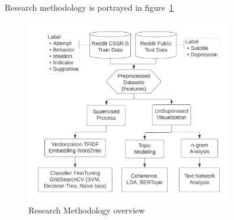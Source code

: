 \documentclass[sn-mathphys,Numbered]{sn-jnl}%
\theoremstyle{thmstyleone}%
\theoremstyle{thmstyletwo}%
\theoremstyle{thmstylethree}%
\begin{document}
Research methodology is portrayed in figure~\ref{fig:res_diagram} 
\begin{figure}[h!]
\centering
\includegraphics[width=0.8\textwidth]{res_diagram.jpeg}
\caption{Research Methodology overview}
\label{fig:res_diagram}
\end{figure}
\end{document}
